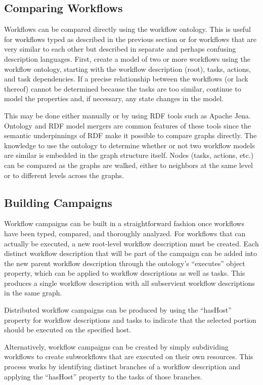 \subsection{Comparing Workflows}

Workflows can be compared directly using the workflow ontology. This is useful
for workflows typed as described in the previous section or for workflows that
are very similar to each other but described in separate and perhaps confusing
description languages. First, create a model of two or more workflows using the
workflow ontology, starting with the workflow description (root), tasks,
actions, and task dependencies. If a precise relationship between the workflows
(or lack thereof) cannot be determined because the tasks are too similar,
continue to model the properties and, if necessary, any state changes in the
model.

This may be done either manually or by using RDF tools such as Apache Jena.
Ontology and RDF model mergers are common features of these tools since the
semantic underpinnings of RDF make it possible to compare graphs directly. The
knowledge to use the ontology to determine whether or not two workflow models
are similar is embedded in the graph structure itself. Nodes
(tasks, actions, etc.) can be compared as the graphs are walked, either to
neighbors at the same level or to different levels across the graphs.

\subsection{Building Campaigns}

Workflow campaigns can be built in a straightforward fashion once workflows have
been typed, compared, and thoroughly analyzed. For workflows that can actually
be executed, a new root-level workflow description must be created. Each
distinct workflow description that will be part of the campaign can be added
into the new parent workflow description through the ontology's
``executes'' object property, which can be applied to workflow descriptions as
well as tasks. This produces a single workflow description with all subservient
workflow descriptions in the same graph.

Distributed workflow campaigns can be produced by using the ``hasHost'' property
for workflow descriptions and tasks to indicate that the selected portion should
be executed on the specified host.

Alternatively, workflow campaigns can be created by simply subdividing
workflows to create subworkflows that are executed on their own resources. This
process works by identifying distinct branches of a workflow description and
applying the ``hasHost'' property to the tasks of those branches. 

